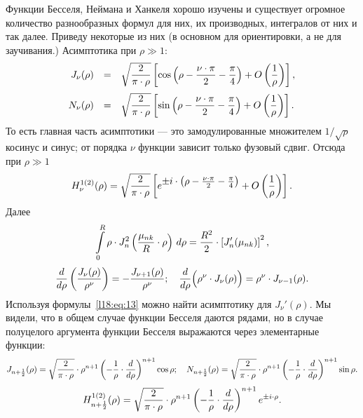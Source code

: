 Функции Бесселя, Неймана и Ханкеля хорошо изучены и существует огромное количество разнообразных формул для них, их производных, интегралов от них и так далее. Приведу некоторые из них (в основном для ориентировки, а не для заучивания.) Асимптотика при $\rho\gg1$:
\begin{equation*}
	\hfill\begin{array}{rcl}
		J_{\nu}(\rho)&=&\displaystyle\sqrt{\frac{2}{\pi\cdot\rho}}\left[\cos\left(\rho-\frac{\nu\cdot\pi}{2}-\frac{\pi}{4}\right)+O\left(\frac{1}{\rho}\right)\right],\\[12pt]
		N_{\nu}(\rho)&=&\displaystyle\sqrt{\frac{2}{\pi\cdot\rho}}\left[\sin\left(\rho-\frac{\nu\cdot\pi}{2}-\frac{\pi}{4}\right)+O\left(\frac{1}{\rho}\right)\right].
	\end{array}\hfill
\end{equation*}
То есть главная часть асимптотики --- это замодулированные множителем $1/\sqrt{\rho}$ косинус и синус; от порядка $\nu$ функции зависит только фузовый сдвиг. Отсюда при $\rho\gg1$
\begin{equation*}
	\hfill H_{\nu}^{1(2)}(\rho)=\displaystyle\sqrt{\frac{2}{\pi\cdot\rho}}\left[e^{\textstyle \pm i\cdot\left(\textstyle\rho-\frac{\nu\cdot\pi}{2}-\frac{\pi}{4}\right)}+O\left(\frac{1}{\rho}\right)\right].\hfill
\end{equation*} 
Далее
\begin{equation*}
	\hfill\int\limits_{0}^{R}\rho\cdot J_{n}^2\left(\frac{\mu_{nk}}{R}\cdot\rho\right)\,d\rho=\frac{R^2}{2}\cdot\left[J_n'(\mu_{nk})\right]^2,\hfill
\end{equation*}
\begin{equation}\label{l18:eq:13}
	\hfill\der{}{\rho}\left(\frac{J_{\nu}(\rho)}{\rho^{\nu}}\right)=-\frac{J_{\nu+1}(\rho)}{\rho^{\nu}};\quad\der{}{\rho}\Big(\rho^{\nu}\cdot J_{\nu}(\rho)\Big)=\rho^{\nu}\cdot J_{\nu-1}(\rho).\hfill		
\end{equation}
Используя формулы~\eqref{l18:eq:13} можно найти асимптотику для $J_{\nu}'(\rho)$.  Мы видели, что в общем случае функции Бесселя даются рядами, но в случае полуцелого аргумента функции Бесселя выражаются через элементарные функции:
\begin{equation*}
	\hfill J_{n+\frac{1}{2}}(\rho)=\sqrt{\frac{2}{\pi\cdot\rho}}\cdot\rho^{n+1}\left(-\frac{1}{\rho}\cdot\der{}{\rho}\right)^{n+1}\cos\rho;\quad N_{n+\frac{1}{2}}(\rho)=\sqrt{\frac{2}{\pi\cdot\rho}}\cdot\rho^{n+1}\left(-\frac{1}{\rho}\cdot\der{}{\rho}\right)^{n+1}\sin\rho.\hfill
\end{equation*}
\begin{equation*}
	\hfill H_{n+\frac{1}{2}}^{1(2)}(\rho)=\sqrt{\frac{2}{\pi\cdot\rho}}\cdot\rho^{n+1}\left(-\frac{1}{\rho}\cdot\der{}{\rho}\right)^{n+1}e^{\pm i\cdot\rho}.\hfill
\end{equation*}
